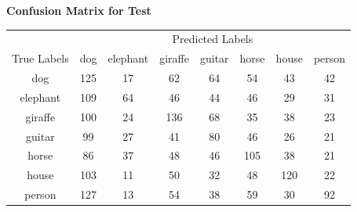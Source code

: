 \documentclass{article}
\begin{document}
    

    
\begin{center}
    \textbf{Confusion Matrix for Test}
    
    \begin{tabular}{c|ccccccc}
    \toprule
    & \multicolumn{7}{c}{Predicted Labels} \\
    \cmidrule(lr){2-8}
    True Labels & dog & elephant & giraffe & guitar & horse & house & person \\
    \midrule
    dog & 125 & 17 & 62 & 64 & 54 & 43 & 42 \\
    elephant & 109 & 64 & 46 & 44 & 46 & 29 & 31 \\
    giraffe & 100 & 24 & 136 & 68 & 35 & 38 & 23 \\
    guitar & 99 & 27 & 41 & 80 & 46 & 26 & 21 \\
    horse & 86 & 37 & 48 & 46 & 105 & 38 & 21 \\
    house & 103 & 11 & 50 & 32 & 48 & 120 & 22 \\
    person & 127 & 13 & 54 & 38 & 59 & 30 & 92 \\
    \bottomrule
    \end{tabular}
    \label{tab:confusion_matrix_test_aug}
\end{center}
        
\end{document}
